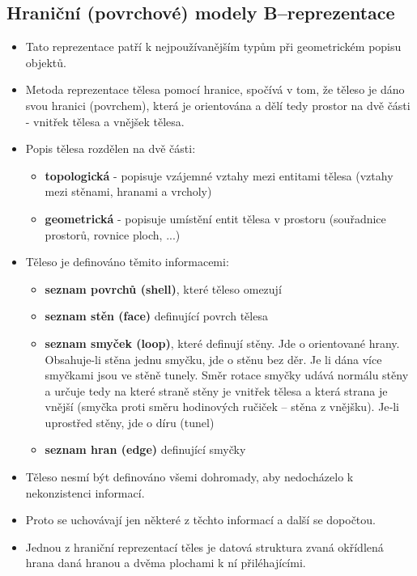 \begin{itemize}
 \subsection{Hraniční (povrchové) modely B--reprezentace}
 \begin{itemize}
 	\item Tato reprezentace patří k nejpoužívanějším typům při geometrickém popisu objektů.
 	\item Metoda reprezentace tělesa pomocí hranice, spočívá v tom, že těleso je dáno svou hranici (povrchem), která je orientována a dělí tedy prostor na dvě části - vnitřek tělesa a vnějšek tělesa.
 	\item Popis tělesa rozdělen na dvě části:
 	\begin{itemize}
		\item \textbf{topologická} - popisuje vzájemné vztahy mezi entitami tělesa (vztahy mezi stěnami, hranami a vrcholy)
		\item \textbf{geometrická} - popisuje umístění entit tělesa v prostoru (souřadnice prostorů, rovnice ploch, ...)
 	\end{itemize}
 	\item Těleso je definováno těmito informacemi:
 	\begin{itemize}
		\item	\textbf{seznam povrchů (shell)}, které těleso omezují
		\item	\textbf{seznam stěn (face)} definující povrch tělesa
		\item	\textbf{seznam smyček (loop)}, které definují stěny. Jde o orientované hrany. Obsahuje-li stěna jednu smyčku, jde o stěnu bez děr. Je li dána více smyčkami jsou ve stěně tunely. Směr rotace smyčky udává 	normálu stěny a určuje tedy na které straně stěny je vnitřek tělesa a která strana je vnější (smyčka proti směru hodinových ručiček – stěna z vnějšku). Je‑li uprostřed stěny, jde o díru (tunel)
		\item	\textbf{seznam hran (edge)} definující smyčky
 	\end{itemize}
 	\item Těleso nesmí být definováno všemi dohromady, aby nedocházelo k nekonzistenci informací.
 	\item Proto se uchovávají jen některé z těchto informací a další se dopočtou.
 	\item Jednou z hraniční reprezentací těles je datová struktura zvaná okřídlená hrana daná hranou a dvěma plochami k ní přiléhajícími.
 \end{itemize}


\end{itemize}
